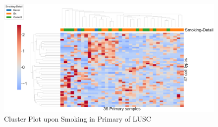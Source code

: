 \documentclass{beamer}
\begin{document}
\begin{frame}[allowframebreaks]
        \begin{figure}
            \includegraphics[width=0.9 \linewidth]{figures/BisqueRNA/clustermap/STAR.FPKM.GSE131907.SQC.Smoking/Primary.pdf}
            \caption{Cluster Plot upon Smoking in Primary of LUSC}
        \end{figure}
    \end{frame}
\end{document}
